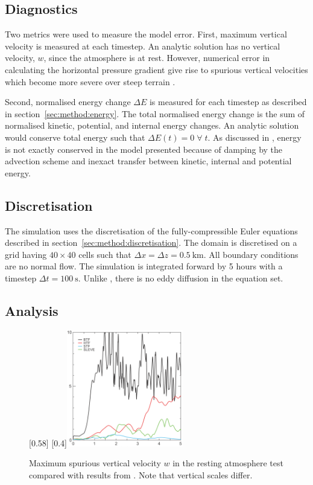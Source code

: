 \subsection{Diagnostics}
Two metrics were used to measure the model error.  First, maximum vertical velocity is measured at each timestep.  An analytic solution has no vertical velocity, $w$, since the atmosphere is at rest.  However, numerical error in calculating the horizontal pressure gradient give rise to spurious vertical velocities which become more severe over steep terrain \autocite{klemp2011}.

Second, normalised energy change $\Delta E$ is measured for each timestep as described in section~\ref{sec:method:energy}.  The total normalised energy change is the sum of normalised kinetic, potential, and internal energy changes.
An analytic solution would conserve total energy such that $\Delta E(t) = 0\;\forall\;t$.  As discussed in \textcite{weller-shahrokhi2014}, energy is not exactly conserved in the model presented because of damping by the advection scheme and inexact transfer between kinetic, internal and potential energy.

\subsection{Discretisation}
The simulation uses the discretisation of the fully-compressible Euler equations described in section~\ref{sec:method:discretisation}.  The domain is discretised on a grid having $40 \times 40$ cells such that $\Delta x = \Delta z = \SI{0.5}{\kilo\meter}$.  All boundary conditions are no normal flow.  The simulation is integrated forward by 5 hours with a timestep $\Delta t = \SI{100}{\second}$.  Unlike \textcite{klemp2011}, there is no eddy diffusion in the equation set.

\subsection{Analysis}

\begin{figure}
	\captionsetup[subfigure]{position=b}
	\centering
	[0.58\textwidth]{}
	\hfill
	[0.4\textwidth]{\vspace{0.27in}\includegraphics[height=2in]{img/klemp-w.png}}
	\caption{Maximum spurious vertical velocity $w$ in the resting atmosphere test compared with results from \textcite{klemp2011}.  Note that vertical scales differ.}
	\label{fig:resting:w}
\end{figure}


